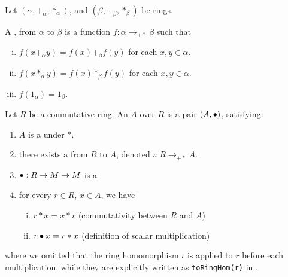 \begin{definition}
    \label{RingHom}
    \leanok

    Let $(\alpha, +_\alpha, *_\alpha)$, and $(\beta, +_\beta, *_\beta)$ be rings.
    
    A , from $\alpha$ to $\beta$ is a function $f : \alpha \to_{+*} \beta$ such that

    \begin{enumerate}[(i)]
        \item $f(x +_{\alpha} y) = f(x) +_{\beta} f(y)$ for each $x,y \in \alpha$.
        \item $f(x *_{\alpha} y) = f(x) *_{\beta} f(y)$ for each $x,y \in \alpha$.
        \item $f(1_{\alpha}) = 1_{\beta}$.
    \end{enumerate}

\end{definition}

\begin{definition}[Algebra]
    \label{Algebra}
    \leanok

    Let $R$ be a commutative ring. An  $A$ over $R$ is a pair $(A, \bullet)$, satisfying:

    \begin{enumerate}
    \item $A$ is a  under $*$.
    
    \item there exists a  from $R$ to $A$, denoted $\iota : R \to_{+*} A$.
    
    \item $\bullet : R \to M \to M$ is a 
    
    \item for every $r \in R$, $x \in A$, we have

    \begin{enumerate}[(i)]
        \item $r * x = x * r$ (commutativity between $R$ and $A$)
        \item $r \bullet x = r * x$ (definition of scalar multiplication)
    \end{enumerate}

    \end{enumerate}

    where we omitted that the ring homomorphism $\iota$ is applied to $r$ before each multiplication,
    while they are explicitly written as \lstinline|toRingHom(r)| in \Mathlib.

\end{definition}

